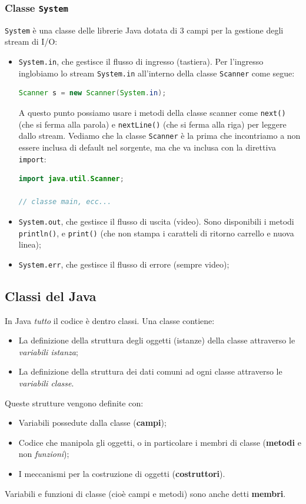 \documentclass[a4paper,11pt]{article}
\begin{document}
\subsubsection{Classe \lstinline|System|}
\lstinline|System| è una classe delle librerie Java dotata di 3 campi per la gestione degli stream di I/O:
\begin{itemize}
	\item \lstinline|System.in|, che gestisce il flusso di ingresso (tastiera).
		Per l'ingresso inglobiamo lo stream \lstinline|System.in| all'interno della classe \lstinline|Scanner| come segue:
\begin{lstlisting}[language=java, style=codestyle]	
Scanner s = new Scanner(System.in);
\end{lstlisting}
A questo punto possiamo usare i metodi della classe scanner come \lstinline|next()| (che si ferma alla parola) e \lstinline|nextLine()| (che si ferma alla riga) per leggere dallo stream.
Vediamo che la classe \lstinline|Scanner| è la prima che incontriamo a non essere inclusa di default nel sorgente, ma che va inclusa con la direttiva \lstinline|import|:
\begin{lstlisting}[language=java, style=codestyle]	
import java.util.Scanner;

// classe main, ecc... 
\end{lstlisting}
	\item \lstinline|System.out|, che gestisce il flusso di uscita (video). Sono disponibili i metodi \lstinline|println()|, e \lstinline|print()| (che non stampa i caratteli di ritorno carrello e nuova linea);
	\item \lstinline|System.err|, che gestisce il flusso di errore (sempre video);
\end{itemize}

\subsection{Classi del Java}
In Java \textit{tutto} il codice è dentro classi.
Una classe contiene:
\begin{itemize}
	\item La definizione della struttura degli oggetti (istanze) della classe attraverso le \textit{variabili istanza};
	\item La definizione della struttura dei dati comuni ad ogni classe attraverso le \textit{variabili classe}.
\end{itemize}
Queste strutture vengono definite con:
\begin{itemize}
	\item Variabili possedute dalla classe (\textbf{campi});
	\item Codice che manipola gli oggetti, o in particolare i membri di classe (\textbf{metodi} e non \textit{funzioni});
	\item I meccanismi per la costruzione di oggetti (\textbf{costruttori}).
\end{itemize}
Variabili e funzioni di classe (cioè campi e metodi) sono anche detti \textbf{membri}.
\end{document}
